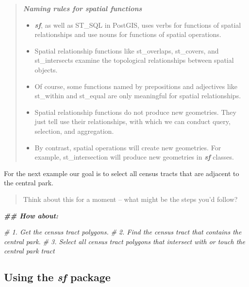 \documentclass[
  11pt,
]{book}
\newenvironment{Shaded}{\begin{snugshade}}{\end{snugshade}}
\newcommand{\CommentTok}[1]{\textcolor[rgb]{0.56,0.35,0.01}{\textit{#1}}}
\newcommand{\DocumentationTok}[1]{\textcolor[rgb]{0.56,0.35,0.01}{\textbf{\textit{#1}}}}
\providecommand{\tightlist}{%
  \setlength{\itemsep}{0pt}\setlength{\parskip}{0pt}}
\begin{document}
\begin{quote}
\textbf{\emph{Naming rules for spatial functions}}

\begin{itemize}
\tightlist
\item
  \textbf{\emph{sf}}, as well as ST\_SQL in PostGIS, uses verbs for functions of spatial relationships and use nouns for functions of spatial operations.
\item
  Spatial relationship functions like st\_overlaps, st\_covers, and st\_intersects examine the topological relationships between spatial objects.
\item
  Of course, some functions named by prepositions and adjectives like st\_within and st\_equal are only meaningful for spatial relationships.
\item
  Spatial relationship functions do not produce new geometries. They just tell use their relationships, with which we can conduct query, selection, and aggregation.
\item
  By contrast, spatial operations will create new geometries. For example, st\_intersection will produce new geometries in \textbf{\emph{sf}} classes.
\end{itemize}
\end{quote}

For the next example our goal is to select all census tracts that are adjacent to the central park.

\begin{quote}
Think about this for a moment -- what might be the steps you'd follow?
\end{quote}

\begin{Shaded}
\begin{Highlighting}[]
\DocumentationTok{\#\# How about:}

\CommentTok{\# 1. Get the census tract polygons.}
\CommentTok{\# 2. Find the census tract that contains the central park.}
\CommentTok{\# 3. Select all census tract polygons that intersect with or touch the central park tract}
\end{Highlighting}
\end{Shaded}

\hypertarget{using-the-sf-package}{%
\subsection{\texorpdfstring{Using the \emph{sf} package}{Using the sf package}}\label{using-the-sf-package}}
\end{document}
